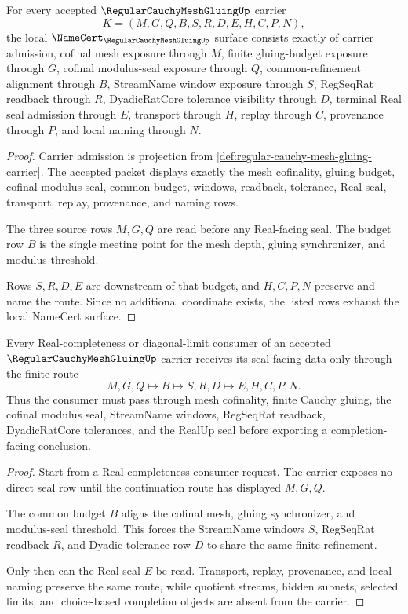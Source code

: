 \begin{theorem}
\label{thm:regular-cauchy-mesh-gluing-namecert-obligations}
For every accepted $\RegularCauchyMeshGluingUp$ carrier
$$
K=(M,G,Q,B,S,R,D,E,H,C,P,N),
$$
the local $\NameCert_{\RegularCauchyMeshGluingUp}$ surface consists exactly of carrier admission, cofinal mesh exposure through $M$, finite gluing-budget exposure through $G$, cofinal modulus-seal exposure through $Q$, common-refinement alignment through $B$, StreamName window exposure through $S$, RegSeqRat readback through $R$, DyadicRatCore tolerance visibility through $D$, terminal Real seal admission through $E$, transport through $H$, replay through $C$, provenance through $P$, and local naming through $N$.
\end{theorem}
\begin{proof}
Carrier admission is projection from \autoref{def:regular-cauchy-mesh-gluing-carrier}. The accepted packet displays exactly the mesh cofinality, gluing budget, cofinal modulus seal, common budget, windows, readback, tolerance, Real seal, transport, replay, provenance, and naming rows.

The three source rows $M,G,Q$ are read before any Real-facing seal. The budget row $B$ is the single meeting point for the mesh depth, gluing synchronizer, and modulus threshold.

Rows $S,R,D,E$ are downstream of that budget, and $H,C,P,N$ preserve and name the route. Since no additional coordinate exists, the listed rows exhaust the local NameCert surface.
\end{proof}

\begin{theorem}
\label{thm:regular-cauchy-mesh-gluing-common-refinement-handoff}
Every Real-completeness or diagonal-limit consumer of an accepted $\RegularCauchyMeshGluingUp$ carrier receives its seal-facing data only through the finite route
$$
M,G,Q \longmapsto B \longmapsto S,R,D \longmapsto E,H,C,P,N .
$$
Thus the consumer must pass through mesh cofinality, finite Cauchy gluing, the cofinal modulus seal, StreamName windows, RegSeqRat readback, DyadicRatCore tolerances, and the RealUp seal before exporting a completion-facing conclusion.
\end{theorem}
\begin{proof}
Start from a Real-completeness consumer request. The carrier exposes no direct seal row until the continuation route has displayed $M,G,Q$.

The common budget $B$ aligns the cofinal mesh, gluing synchronizer, and modulus-seal threshold. This forces the StreamName windows $S$, RegSeqRat readback $R$, and Dyadic tolerance row $D$ to share the same finite refinement.

Only then can the Real seal $E$ be read. Transport, replay, provenance, and local naming preserve the same route, while quotient streams, hidden subnets, selected limits, and choice-based completion objects are absent from the carrier.
\end{proof}

